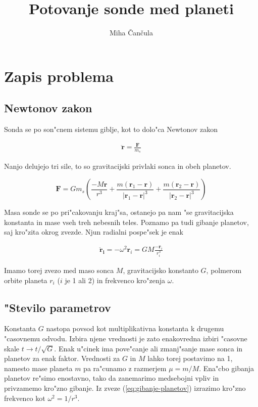 \documentclass[a4paper,10pt]{article}
\title{Potovanje sonde med planeti}
\author{Miha \v Can\v cula}
\renewcommand{\vec}{\mathbf}
\begin{document}
\maketitle


\section{Zapis problema}

\subsection{Newtonov zakon}
Sonda se po son"cnem sistemu giblje, kot to dolo"ca Newtonov zakon

\begin{align}
  \vec{\ddot r}= \frac{\vec F}{m_s}
\end{align}

Nanjo delujejo tri sile, to so gravitacijski privlaki sonca in obeh planetov. 

$$ \vec F = Gm_s \left( \frac{-M\vec r}{r^3} + \frac{m(\vec r_1 - \vec r)}{|\vec r_1 - \vec r|^3} + \frac{m(\vec r_2 - \vec r)}{|\vec r_2 - \vec r|^3} \right) $$

Masa sonde se po pri"cakovanju kraj"sa, ostanejo pa nam "se gravitacijska konstanta in mase vseh treh nebesnih teles. Poznamo pa tudi gibanje planetov, saj kro"zita okrog zvezde. Njun radialni pospe"sek je enak

\begin{align}
\label{eq:gibanje-planetov}
\vec{\ddot r_i} = -\omega^2\vec r_i = GM \frac{-\vec r_i}{r_i^3}
\end{align}

Imamo torej zvezo med maso sonca $M$, gravitacijsko konstanto $G$, polmerom orbite planeta $r_i$ ($i$ je 1 ali 2) in frekvenco kro"zenja $\omega$. 

\subsection{"Stevilo parametrov}
Konstanta $G$ nastopa povsod kot multiplikativna konstanta k drugemu "casovnemu odvodu. Izbira njene vrednosti je zato enakovredna izbiri "casovne skale $t \to t/\sqrt{G}$. Enak u"cinek ima pove"canje ali zmanj"sanje mase sonca in planetov za enak faktor. Vrednosti za $G$ in $M$ lahko torej postavimo na 1, namesto mase planeta $m$ pa ra"cunamo z razmerjem $\mu = m/M$. Ena"cbo gibanja planetov re"simo enostavno, tako da zanemarimo medsebojni vpliv in privzamemo kro"zno gibanje. Iz zveze (\ref{eq:gibanje-planetov}) izrazimo kro"zno frekvenco kot $\omega^2 = 1/r^3$. 
\end{document}
